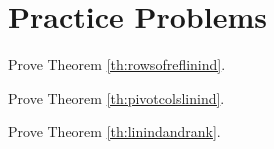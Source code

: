 \documentclass{ximera}
\begin{document}
\section*{Practice Problems}
\begin{problem}\label{prob:proofofrowsofreflinind}
Prove Theorem \ref{th:rowsofreflinind}.
\end{problem}

\begin{problem}\label{prob:proofofpivotcolslinind}
Prove Theorem \ref{th:pivotcolslinind}.
\end{problem}

\begin{problem}\label{prob:proofoflinindandrank}
Prove Theorem \ref{th:linindandrank}.
\end{problem}
\end{document}
